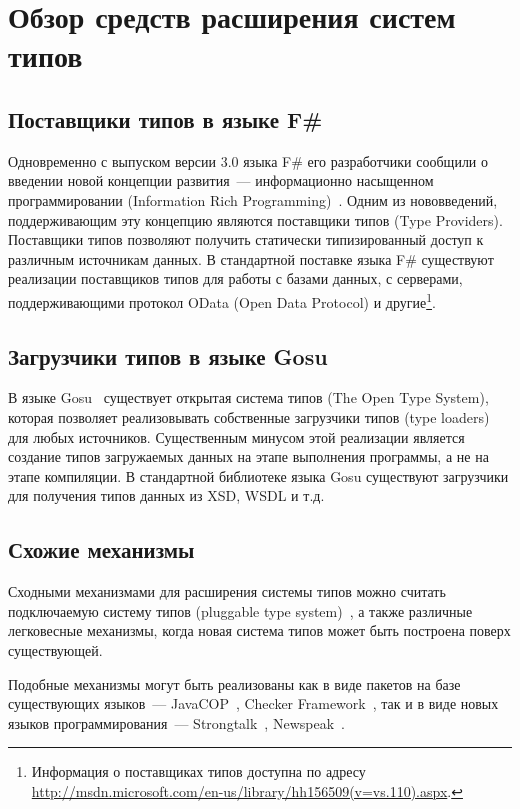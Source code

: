 \section{Обзор средств расширения систем типов}
\subsection{Поставщики типов в языке F\#}
Одновременно с выпуском версии 3.0 языка F\# его разработчики сообщили о введении новой концепции развития~--- информационно насыщенном программировании (Information Rich Programming)~\cite{joepamer2011}.
Одним из нововведений, поддерживающим эту концепцию являются поставщики типов (Type Providers).
Поставщики типов позволяют получить статически типизированный доступ к различным источникам данных.
В стандартной поставке языка F\# существуют реализации поставщиков типов для работы с базами данных, с серверами, поддерживающими протокол OData (Open Data Protocol) и другие\footnote{Информация о поставщиках типов доступна по адресу \url{http://msdn.microsoft.com/en-us/library/hh156509(v=vs.110).aspx}.}.
\subsection{Загрузчики типов в языке Gosu}
В языке Gosu~\cite{gosuguide} существует открытая система типов (The Open Type System), которая позволяет реализовывать собственные загрузчики типов (type loaders) для любых источников.
Существенным минусом этой реализации является создание типов загружаемых данных на этапе выполнения программы, а не на этапе компиляции.
В стандартной библиотеке языка Gosu существуют загрузчики для получения типов данных из XSD, WSDL и т.д.
\subsection{Схожие механизмы}
Сходными механизмами для расширения системы типов можно считать подключаемую систему типов (pluggable type system)~\cite{bracha}, а также различные легковесные механизмы, когда новая система типов может быть построена поверх существующей.

Подобные механизмы могут быть реализованы как в виде пакетов на базе существующих языков~--- JavaCOP~\cite{javacop2010}, Checker Framework~\cite{checkerframework2008},
так и в виде новых языков программирования~--- Strongtalk~\cite{strongtalk1993}, Newspeak~\cite{newspeak2008}.
